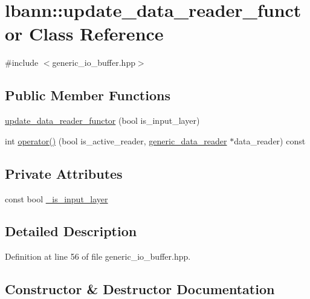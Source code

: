 \hypertarget{classlbann_1_1update__data__reader__functor}{}\section{lbann\+:\+:update\+\_\+data\+\_\+reader\+\_\+functor Class Reference}
\label{classlbann_1_1update__data__reader__functor}


{\ttfamily \#include $<$generic\+\_\+io\+\_\+buffer.\+hpp$>$}

\subsection*{Public Member Functions}
\begin{DoxyCompactItemize}
\item 
\hyperlink{classlbann_1_1update__data__reader__functor_a6ec66d94744ddffe84a7d896ac437e8b}{update\+\_\+data\+\_\+reader\+\_\+functor} (bool is\+\_\+input\+\_\+layer)
\item 
int \hyperlink{classlbann_1_1update__data__reader__functor_af7bb363237370dd7b84364fea740bcdf}{operator()} (bool is\+\_\+active\+\_\+reader, \hyperlink{classlbann_1_1generic__data__reader}{generic\+\_\+data\+\_\+reader} $\ast$data\+\_\+reader) const
\end{DoxyCompactItemize}
\subsection*{Private Attributes}
\begin{DoxyCompactItemize}
\item 
const bool \hyperlink{classlbann_1_1update__data__reader__functor_a5a8bc619956adeeeb988e2e6eaa95ca4}{\+\_\+is\+\_\+input\+\_\+layer}
\end{DoxyCompactItemize}


\subsection{Detailed Description}


Definition at line 56 of file generic\+\_\+io\+\_\+buffer.\+hpp.



\subsection{Constructor \& Destructor Documentation}
\mbox{\label{classlbann_1_1update__data__reader__functor_a6ec66d94744ddffe84a7d896ac437e8b}} 
